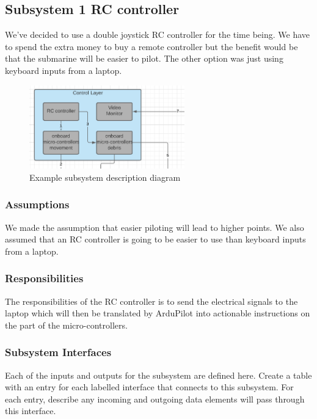 

\subsection{Subsystem 1 RC controller}
We've decided to use a double joystick RC controller for the time being. We have to spend the extra money to buy a remote controller but the benefit would be that the submarine will be easier to pilot. The other option was just using keyboard inputs from a laptop.

\begin{figure}[h!]
	\centering
 	\includegraphics[width=0.60\textwidth]{images/subsystem_control}
 \caption{Example subsystem description diagram}
\end{figure}

\subsubsection{Assumptions}
We made the assumption that easier piloting will lead to higher points. We also assumed that an RC controller is going to be easier to use than keyboard inputs from a laptop.

\subsubsection{Responsibilities}
The responsibilities of the RC controller is to send the electrical signals to the laptop which will then be translated by ArduPilot into actionable instructions on the part of the micro-controllers. 

\subsubsection{Subsystem Interfaces}
Each of the inputs and outputs for the subsystem are defined here. Create a table with an entry for each labelled interface that connects to this subsystem. For each entry, describe any incoming and outgoing data elements will pass through this interface.


